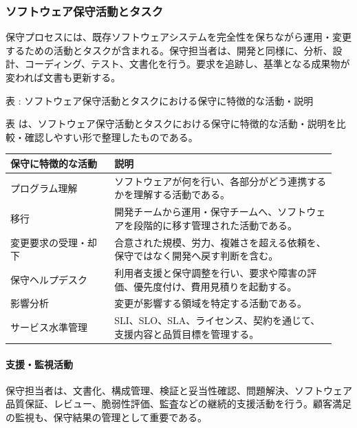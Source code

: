 \subsubsection{ソフトウェア保守活動とタスク}
保守プロセスには、既存ソフトウェアシステムを完全性を保ちながら運用・変更するための活動とタスクが含まれる。保守担当者は、開発と同様に、分析、設計、コーディング、テスト、文書化を行う。要求を追跡し、基準となる成果物が変われば文書も更新する。\par
\par\smallskip\noindent{}\label{tab:ch07-10}表 \thetable: ソフトウェア保守活動とタスクにおける保守に特徴的な活動・説明\par\smallskip
表 \thetable は、ソフトウェア保守活動とタスクにおける保守に特徴的な活動・説明を比較・確認しやすい形で整理したものである。\par\smallskip
\begin{longtable}{p{0.30\linewidth}p{0.64\linewidth}}
\toprule
保守に特徴的な活動 & 説明 \\
\midrule
\endhead
プログラム理解 & ソフトウェアが何を行い、各部分がどう連携するかを理解する活動である。 \\
移行 & 開発チームから運用・保守チームへ、ソフトウェアを段階的に移す管理された活動である。 \\
変更要求の受理・却下 & 合意された規模、労力、複雑さを超える依頼を、保守ではなく開発へ戻す判断を含む。 \\
保守ヘルプデスク & 利用者支援と保守調整を行い、要求や障害の評価、優先度付け、費用見積りを起動する。 \\
影響分析 & 変更が影響する領域を特定する活動である。 \\
サービス水準管理 & SLI、SLO、SLA、ライセンス、契約を通じて、支援内容と品質目標を管理する。 \\
\bottomrule
\end{longtable}
\paragraph{支援・監視活動}
保守担当者は、文書化、構成管理、検証と妥当性確認、問題解決、ソフトウェア品質保証、レビュー、脆弱性評価、監査などの継続的支援活動を行う。顧客満足の監視も、保守結果の管理として重要である。\par
